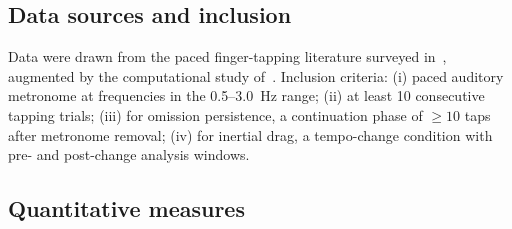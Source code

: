 \documentclass[12pt,a4paper]{article}
\begin{document}
\subsection{Data sources and inclusion}



Data were drawn from the paced finger-tapping literature surveyed in~\cite{repp2005sensorimotor}, augmented by the computational study of~\cite{silva2024}. Inclusion criteria: (i) paced auditory metronome at frequencies in the 0.5--3.0~Hz range; (ii) at least 10 consecutive tapping trials; (iii) for omission persistence, a continuation phase of $\ge 10$ taps after metronome removal; (iv) for inertial drag, a tempo-change condition with pre- and post-change analysis windows.



\subsection{Quantitative measures}
\end{document}
